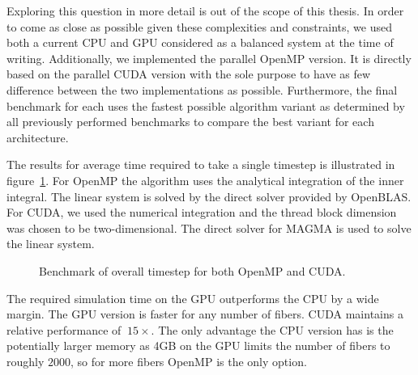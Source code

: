 \documentclass[a4paper,11pt]{kth-mag}
\begin{document}
Exploring this question in more detail is out of the scope of this thesis. In order to come as close as possible given these complexities and constraints, we used both a current CPU and GPU considered as a balanced system at the time of writing. Additionally, we implemented the parallel OpenMP version. It is directly based on the parallel CUDA version with the sole purpose to have as few difference between the two implementations as possible. Furthermore, the final benchmark for each uses the fastest possible algorithm variant as determined by all previously performed benchmarks to compare the best variant for each architecture.

The results for average time required to take a single timestep is illustrated in figure~\ref{fig:overall}. For OpenMP the algorithm uses the analytical integration of the inner integral. The linear system is solved by the direct solver provided by OpenBLAS. For CUDA, we used the numerical integration and the thread block dimension was chosen to be two-dimensional. The direct solver for MAGMA is used to solve the linear system.

\begin{figure}
  \centering
  \caption{Benchmark of overall timestep for both OpenMP and CUDA.}
  \label{fig:overall}
\end{figure}

The required simulation time on the GPU outperforms the CPU by a wide margin. The GPU version is faster for any number of fibers. CUDA maintains a relative performance of $~15×$. The only advantage the CPU version has is the potentially larger memory as 4GB on the GPU limits the number of fibers to roughly $2000$, so for more fibers OpenMP is the only option.
\end{document}
